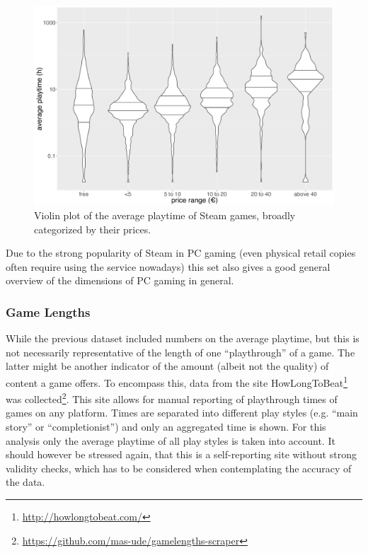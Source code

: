 \begin{figure}[!t]
	\centering
	\includegraphics[width=1.0\columnwidth]{images/steam-cost-vs-playtime-non-sale.pdf}
	\caption{Violin plot of the average playtime of Steam games, broadly categorized by their prices.}
\label{fig:steam-cost-vs-playtime-violin}
\end{figure}

Due to the strong popularity of Steam in PC gaming (even physical retail copies often require using the service nowadays) this set also gives a good general overview of the dimensions of PC gaming in general.


\subsubsection{Game Lengths}

While the previous dataset included numbers on the average playtime, but this is not necessarily representative of the length of one ``playthrough'' of a game. The latter might be another indicator of the amount (albeit not the quality) of content a game offers. To encompass this, data from the site HowLongToBeat\footnote{\url{http://howlongtobeat.com/}} was collected\footnote{\url{https://github.com/mas-ude/gamelengths-scraper}}. This site allows for manual reporting of playthrough times of games on any platform. Times are separated into different play styles (e.g. ``main story'' or ``completionist'') and only an aggregated time is shown. For this analysis only the average playtime of all play styles is taken into account. It should however be stressed again, that this is a self-reporting site without strong validity checks, which has to be considered when contemplating the accuracy of the data.

